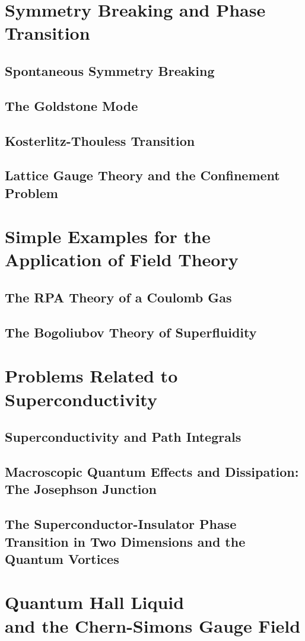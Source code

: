 \documentclass[twoside,11pt]{report}
\begin{document}
\chapter{Symmetry Breaking and Phase Transition}
\section{Spontaneous Symmetry Breaking}
\section{The Goldstone Mode}
\section{Kosterlitz-Thouless Transition}
\section{Lattice Gauge Theory and the Confinement Problem}
\chapter{Simple Examples for the Application of Field Theory}
\section{The RPA Theory of a Coulomb Gas}
\section{The Bogoliubov Theory of Superfluidity}
\chapter{Problems Related to Superconductivity}
\section{Superconductivity and Path Integrals}
\section{Macroscopic Quantum Effects and Dissipation: The Josephson Junction}
\section{The Superconductor-Insulator Phase Transition in Two Dimensions and the Quantum Vortices}
\chapter{Quantum Hall Liquid\\ and the Chern-Simons Gauge Field}
\end{document}
